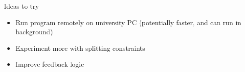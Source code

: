\documentclass{beamer}
\begin{document}
\begin{frame}{Ideas to try}
\begin{itemize}
\item Run program remotely on university PC (potentially faster, and can run in background)
\item Experiment more with splitting constraints
\item Improve feedback logic
\end{itemize}
\end{frame}
\end{document}
